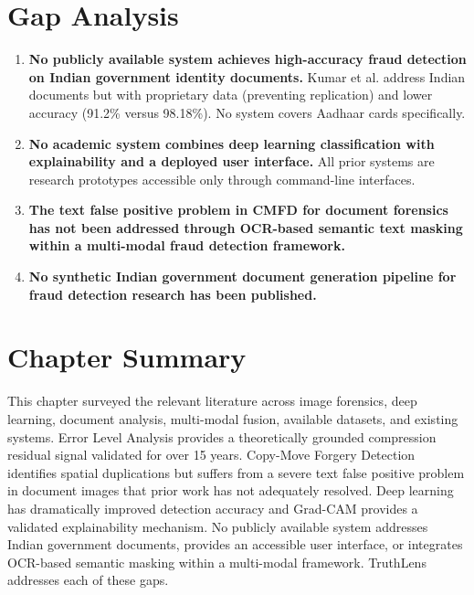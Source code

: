\documentclass[12pt,a4paper,oneside]{report}
\begin{document}
\section{Gap Analysis}
\label{sec:gap}

\begin{enumerate}[label=\textbf{G\arabic*:}]

\item \textbf{No publicly available system achieves high-accuracy fraud detection
on Indian government identity documents.} Kumar et al. \cite{kumar2022} address
Indian documents but with proprietary data (preventing replication) and lower
accuracy (91.2\% versus 98.18\%). No system covers Aadhaar cards specifically.

\item \textbf{No academic system combines deep learning classification with
explainability and a deployed user interface.} All prior systems are research
prototypes accessible only through command-line interfaces.

\item \textbf{The text false positive problem in CMFD for document forensics has
not been addressed through OCR-based semantic text masking within a multi-modal
fraud detection framework.}

\item \textbf{No synthetic Indian government document generation pipeline for
fraud detection research has been published.}

\end{enumerate}

\section{Chapter Summary}

This chapter surveyed the relevant literature across image forensics, deep
learning, document analysis, multi-modal fusion, available datasets, and existing
systems. Error Level Analysis provides a theoretically grounded compression
residual signal validated for over 15 years. Copy-Move Forgery Detection
identifies spatial duplications but suffers from a severe text false positive
problem in document images that prior work has not adequately resolved. Deep
learning has dramatically improved detection accuracy and Grad-CAM provides a
validated explainability mechanism. No publicly available system addresses
Indian government documents, provides an accessible user interface, or integrates
OCR-based semantic masking within a multi-modal framework. TruthLens addresses
each of these gaps.
\end{document}
